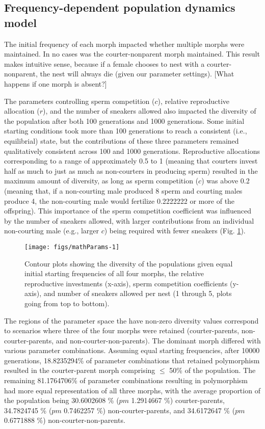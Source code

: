 \documentclass[11pt,]{article}
\begin{document}
\hypertarget{frequency-dependent-population-dynamics-model-1}{%
\subsection{Frequency-dependent population dynamics model}\label{frequency-dependent-population-dynamics-model-1}}

The initial frequency of each morph impacted whether multiple morphs were maintained. In no cases was the courter-nonparent morph maintained. This result makes intuitive sense, because if a female chooses to nest with a courter-nonparent, the nest will always die (given our parameter settings). {[}What happens if one morph is absent?{]}

The parameters controlling sperm competition (\(c\)), relative reproductive allocation (\(r\)), and the number of sneakers allowed also impacted the diversity of the population after both 100 generations and 1000 generations. Some initial starting conditions took more than 100 generations to reach a consistent (i.e., equilibrial) state, but the contributions of these three parameters remained qualitatively consistent across 100 and 1000 generations. Reproductive allocations corresponding to a range of approximately 0.5 to 1 (meaning that courters invest half as much to just as much as non-courters in producing sperm) resulted in the maximum amount of diversity, as long as sperm competition (\(c\)) was above 0.2 (meaning that, if a non-courting male produced 8 sperm and courting males produce 4, the non-courting male would fertilize 0.2222222 or more of the offspring). This importance of the sperm competition coefficient was influenced by the number of sneakers allowed, with larger contributions from an individual non-courting male (e.g., larger \(c\)) being required with fewer sneakers (Fig. \ref{fig:mathParams}).

\begin{figure}[H]
\texttt{[image: figs/mathParams-1]} \caption{Contour plots showing the diversity of the populations given equal initial starting frequencies of all four morphs, the relative reproductive investments (x-axis), sperm competition coefficients (y-axis), and number of sneakers allowed per nest (1 through 5, plots going from top to bottom).}\label{fig:mathParams}
\end{figure}

The regions of the parameter space the have non-zero diversity values correspond to scenarios where three of the four morphs were retained (courter-parents, non-courter-parents, and non-courter-non-parents). The dominant morph differed with various parameter combinations. Assuming equal starting frequencies, after 10000 generations, 18.8235294\% of parameter combinations that retained polymorphism resulted in the courter-parent morph comprising \(\le\) 50\% of the population. The remaining 81.1764706\% of parameter combinations resulting in polymorphism had more equal representation of all three morphs, with the average proportion of the population being 30.6002608 \% (\(pm\) 1.2914667 \%) courter-parents, 34.7824745 \% (\(pm\) 0.7462257 \%) non-courter-parents, and 34.6172647 \% (\(pm\) 0.6771888 \%) non-courter-non-parents.
\end{document}
